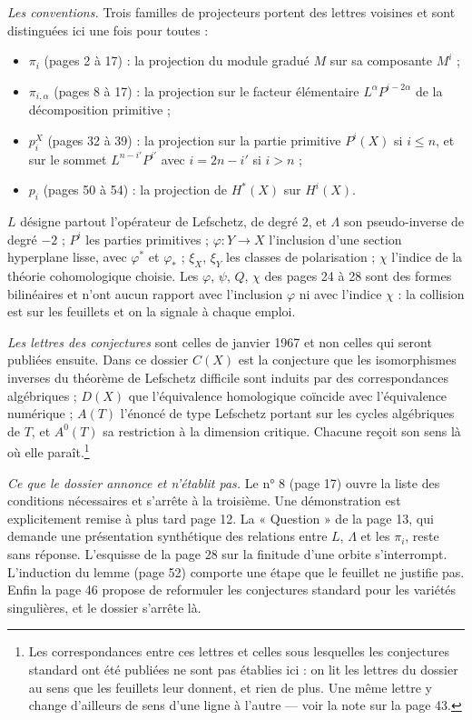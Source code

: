 \documentclass[11pt,a4paper]{article}
\begin{document}
\emph{Les conventions.} Trois familles de projecteurs portent des lettres
voisines et sont distinguées ici une fois pour toutes :

\begin{itemize}
  \item $\pi_{i}$ (pages 2 à 17) : la projection du module gradué $M$ sur sa
  composante $M^{i}$ ;
  \item $\pi_{i,\alpha}$ (pages 8 à 17) : la projection sur le facteur
  élémentaire $L^{\alpha} P^{i-2\alpha}$ de la décomposition primitive ;
  \item $p^{X}_{i}$ (pages 32 à 39) : la projection sur la partie primitive
  $P^{i}(X)$ si $i \leqslant n$, et sur le sommet $L^{n-i'}P^{i'}$ avec
  $i = 2n-i'$ si $i > n$ ;
  \item $p_{i}$ (pages 50 à 54) : la projection de $H^{*}(X)$ sur $H^{i}(X)$.
\end{itemize}

$L$ désigne partout l'opérateur de Lefschetz, de degré $2$, et $\Lambda$ son
pseudo-inverse de degré $-2$ ; $P^{i}$ les parties primitives ;
$\varphi \colon Y \to X$ l'inclusion d'une section hyperplane lisse, avec
$\varphi^{*}$ et $\varphi_{*}$ ; $\xi_{X}$, $\xi_{Y}$ les classes de
polarisation ; $\chi$ l'indice de la théorie cohomologique choisie. Les
$\varphi$, $\psi$, $Q$, $\chi$ des pages 24 à 28 sont des formes bilinéaires
et n'ont aucun rapport avec l'inclusion $\varphi$ ni avec l'indice $\chi$ : la
collision est sur les feuillets et on la signale à chaque emploi.

\emph{Les lettres des conjectures} sont celles de janvier 1967 et non celles
qui seront publiées ensuite. Dans ce dossier $C(X)$ est la conjecture que les
isomorphismes inverses du théorème de Lefschetz difficile sont induits par des
correspondances algébriques ; $D(X)$ que l'équivalence homologique coïncide
avec l'équivalence numérique ; $A(T)$ l'énoncé de type Lefschetz portant sur
les cycles algébriques de $T$, et $A^{0}(T)$ sa restriction à la dimension
critique. Chacune reçoit son sens là où elle paraît.\footnote{Les
correspondances entre ces lettres et celles sous lesquelles les conjectures
standard ont été publiées ne sont pas établies ici : on lit les lettres du
dossier au sens que les feuillets leur donnent, et rien de plus. Une même
lettre y change d'ailleurs de sens d'une ligne à l'autre — voir la note sur la
page 43.}

\emph{Ce que le dossier annonce et n'établit pas.} Le n° 8 (page 17) ouvre la
liste des conditions nécessaires et s'arrête à la troisième. Une démonstration
est explicitement remise à plus tard page 12. La « Question » de la page 13,
qui demande une présentation synthétique des relations entre $L$, $\Lambda$ et
les $\pi_{i}$, reste sans réponse. L'esquisse de la page 28 sur la finitude
d'une orbite s'interrompt. L'induction du lemme (page 52) comporte une étape
que le feuillet ne justifie pas. Enfin la page 46 propose de reformuler les
conjectures standard pour les variétés singulières, et le dossier s'arrête là.
\end{document}
